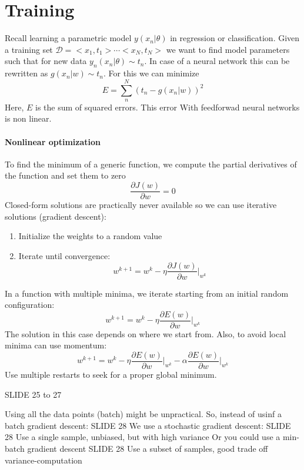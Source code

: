 \section{Training}

Recall learning a parametric model $y(x_n|\theta)$ in regression or classification.
Given a training set $\mathcal{D}=<x_1,t_1>\cdots<x_N,t_N>$ we want to find model parameters such that for new data $y_n(x_n|\theta)\sim t_n$.
In case of a neural network this can be rewritten as $g(x_n|w)\sim t_n$. 
For this we can minimize 
\[E=\sum_n^N\left(t_n-g(x_n|w)\right)^2\]
Here, $E$ is the sum of squared errors. 
This error With feedforwad neural networks is non linear.

\paragraph*{Nonlinear optimization}
To find the minimum of a generic function, we compute the partial derivatives of the function and set them to zero
\[\dfrac{\partial J(w)}{\partial w}=0\]
Closed-form solutions are practically never available so we can use
iterative solutions (gradient descent):
\begin{enumerate}
    \item Initialize the weights to a random value
    \item Iterate until convergence: 
        \[w^{k+1}=w^k-\eta\dfrac{\partial J(w)}{\partial w}\Bigg|_{w^k}\]
\end{enumerate}
In a function with multiple minima, we iterate starting from an initial
random configuration: 
\[w^{k+1}=w^k-\eta\dfrac{\partial E(w)}{\partial w}\Bigg|_{w^k}\]
The solution in this case depends on where we start from.
Also, to avoid local minima can use momentum: 
\[w^{k+1}=w^k-\eta\dfrac{\partial E(w)}{\partial w}\Bigg|_{w^k}-\alpha\dfrac{\partial E(w)}{\partial w}\Bigg|_{w^k}\]
Use multiple restarts to seek for a proper global minimum.

\begin{example}
    SLIDE 25 to 27
\end{example}

Using all the data points (batch) might be unpractical. 
So, instead of usinf a batch gradient descent: 
SLIDE 28
We use a stochastic gradient descent: 
SLIDE 28 
Use a single sample,
unbiased, but with
high variance
Or you could use a min-batch gradient descent
SLIDE 28
Use a subset of
samples, good trade off
variance-computation









